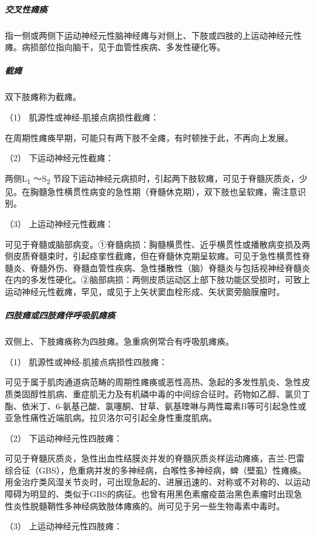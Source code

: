 \subparagraph{交叉性瘫痪}

指一侧或两侧下运动神经元性脑神经瘫与对侧上、下肢或四肢的上运动神经元性瘫。病损部位指向脑干，见于血管性疾病、多发性硬化等。

\subparagraph{截瘫}

双下肢瘫称为截瘫。

\hypertarget{text00018.htmlux5cux23CHP1-6-2-3-7-1}{}
（1） 肌源性或神经-肌接点病损性截瘫：

在周期性瘫痪早期，可能只有两下肢不全瘫，有时顿挫于此，不再向上发展。

\hypertarget{text00018.htmlux5cux23CHP1-6-2-3-7-2}{}
（2） 下运动神经元性截瘫：

两侧L\textsubscript{1} ～S\textsubscript{2}
节段下运动神经元病损时，引起两下肢软瘫，可见于脊髓灰质炎，少见。在胸髓急性横贯性病变的急性期（脊髓休克期），双下肢也呈软瘫，需注意识别。

\hypertarget{text00018.htmlux5cux23CHP1-6-2-3-7-3}{}
（3） 上运动神经元性截瘫：

可见于脊髓或脑部病变。①脊髓病损：胸髓横贯性、近乎横贯性或播散病变损及两侧皮质脊髓束时，引起痉挛性截瘫，但在脊髓休克期呈软瘫。可见于急性横贯性脊髓炎、脊髓外伤、脊髓血管性疾病、急性播散性（脑）脊髓炎与包括视神经脊髓炎在内的多发性硬化。②脑部病损：两侧皮质运动区上部下肢功能区受损时，可致上运动神经元性截瘫，罕见，或见于上矢状窦血栓形成、矢状窦旁脑膜瘤时。

\subparagraph{四肢瘫或四肢瘫伴呼吸肌瘫痪}

双侧上、下肢瘫痪称为四肢瘫。急重病例常合有呼吸肌瘫痪。

\hypertarget{text00018.htmlux5cux23CHP1-6-2-3-8-1}{}
（1） 肌源性或神经-肌接点病损性四肢瘫：

可见于属于肌肉通道病范畴的周期性瘫痪或恶性高热、急起的多发性肌炎、急性皮质类固醇性肌病、重症肌无力及有机磷中毒的中间综合征时。药物如乙醇、氯贝丁酯、依米丁、6-氨基己酸、氯噻酮、甘草、氨基喹啉与两性霉素B等可引起急性或亚急性痛性近端肌病。拉贝洛尔可引起全身性重度肌病。

\hypertarget{text00018.htmlux5cux23CHP1-6-2-3-8-2}{}
（2） 下运动神经元性四肢瘫：

可见于脊髓灰质炎，急性出血性结膜炎并发的脊髓灰质炎样运动瘫痪，吉兰-巴雷综合征（GBS），危重病并发的多神经病，白喉性多神经病，蜱（壁虱）性瘫痪。用金治疗类风湿关节炎时，可出现急起的、进展迅速的、对称或不对称的、以运动障碍为明显的、类似于GBS的病征。也曾有用黑色素瘤疫苗治黑色素瘤时出现急性炎性脱髓鞘性多神经病致肢体瘫痪的。尚可见于另一些生物毒素中毒时。

\hypertarget{text00018.htmlux5cux23CHP1-6-2-3-8-3}{}
（3） 上运动神经元性四肢瘫：


